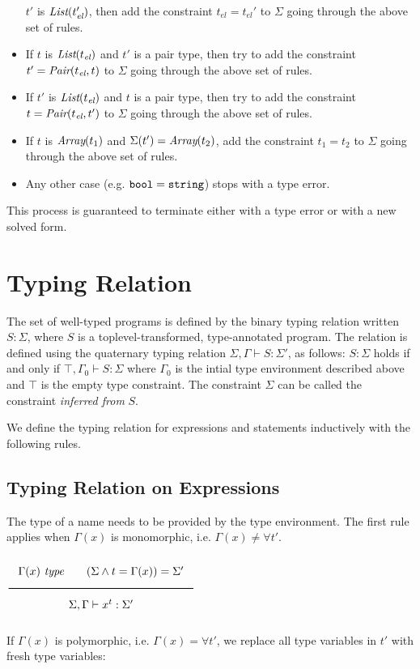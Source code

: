 \begin{itemize}
  $t'$ is $\textit{List}(t_\textit{el} ')$, then add the constraint
  $t_\textit{el} = t_\textit{el} '$ to $\Sigma$ going through the above set of rules.
\item If $t$ is $\textit{List}(t_\textit{el})$ and
$t'$ is a pair type, then try to add the constraint $t' = \textit{Pair}(t_\textit{el}, t)$ to $\Sigma$ going through the above set of rules.
\item If $t'$ is $\textit{List}(t_\textit{el})$ and
$t$ is a pair type, then try to add the constraint $t = \textit{Pair}(t_\textit{el}, t')$ to $\Sigma$ going through the above set of rules.
\item If $t$ is $\textit{Array}(t_1)$ and $\Sigma(t')=\textit{Array}(t_2)$, add the constraint $t_1=t_2$ to $\Sigma$ going through the above set of rules.
\item Any other case  (e.g. $\texttt{bool} = \texttt{string}$) stops with a type error.
\end{itemize}
This process is guaranteed to terminate either with a type error or with a new solved form.

\section{Typing Relation}

The set of well-typed programs is defined by the binary typing relation
written $S: \Sigma$, where $S$ is a toplevel-transformed, type-annotated program.
The relation is defined using the quaternary typing relation
$\Sigma, \Gamma \vdash S : \Sigma'$, as follows:
$S: \Sigma$ holds if and only if 
$\top, \Gamma_0 \vdash S : \Sigma$
where $\Gamma_0$ is the intial type environment described above and $\top$ is the empty
type constraint. The constraint $\Sigma$ can be called the constraint \emph{inferred from}
$S$. 

We define the typing relation for expressions and statements
inductively with the following rules.

\subsection{Typing Relation on Expressions}

The type of a name needs to be provided by the type environment. The first rule
applies when $\Gamma(x)$ is monomorphic, i.e. $\Gamma(x) \neq \forall t'$.

\noindent
$\Rule{\Gamma(x)\ \type \qquad
  (\Sigma \wedge t = \Gamma(x)) = \Sigma'}{\Sigma, \Gamma \vdash x^t : \Sigma'}$

If $\Gamma(x)$ is polymorphic,  i.e. $\Gamma(x) = \forall t'$, we replace all type variables in
$t'$ with fresh type variables:


